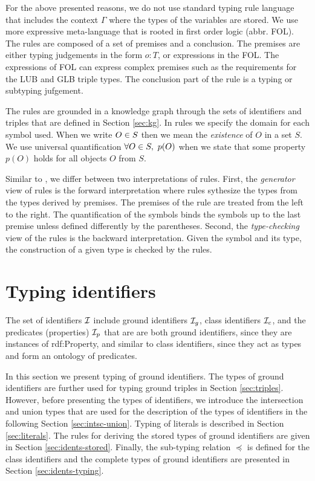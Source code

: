 \documentclass[runningheads]{llncs}
\newcommand{\I}{{\cal I}}
\begin{document}
For the above presented reasons, we do not use standard typing rule
language \cite{Pierce2002,Hindley1997} that includes the context
$\Gamma$ where the types of the variables are stored. We use more
expressive meta-language that is rooted in first order logic
(abbr. FOL). The rules are composed of a set of premises and a
conclusion. The premises are either typing judgements in the form
$o:T$, or expressions in the FOL. The expressions of FOL can express
complex premises such as the requirements for the LUB and GLB triple
types. The conclusion part of the rule is a typing or subtyping
jufgement.

The rules are grounded in a knowledge graph through the sets of
identifiers and triples that are defined in Section
\ref{sec:kg}. In rules we specify the domain for each symbol used.
When we write $O\in\/S$ then we mean the \emph{existence} of $O$ in a
set $S$. We use universal quantification $\forall\/O\in\/S,\ p(O)$
when we state that some property $p(O)$ holds for all objects $O$ from
$S$.

Similar to \cite{Dunfield2021}, we differ between two interpretations
of rules. First, the \emph{generator} view of rules is the forward
interpretation where rules sythesize the types from the types derived
by premises. The premises of the rule are treated from the left to the
right. The quantification of the symbols binds the symbols up to the
last premise unless defined differently by the parentheses. Second,
the \emph{type-checking} view of the rules is the backward
interpretation. Given the symbol and its type, the construction of a
given type is checked by the rules.




\section{Typing identifiers}

The set of identifiers $\I$ include ground identifiers $\I_g$, class
identifiers $\I_c$, and the predicates (properties) $\I_p$ that are
are both ground identifiers, since they are instances of rdf:Property,
and similar to class identifiers, since they act as types and form an
ontology of predicates.

In this section we present typing of ground identifiers. The types of
ground identifiers are further used for typing ground triples in
Section \ref{sec:triples}. However, before presenting the types of
identifiers, we introduce the intersection and union types that are
used for the description of the types of identifiers in the following
Section \ref{sec:intsc-union}. Typing of literals is described in
Section \ref{sec:literals}. The rules for deriving the stored types of
ground identifiers are given in Section
\ref{sec:idents-stored}. Finally, the sub-typing relation $\preceq$ is
defined for the class identifiers and the complete types of ground
identifiers are presented in Section \ref{sec:idents-typing}.
\end{document}
